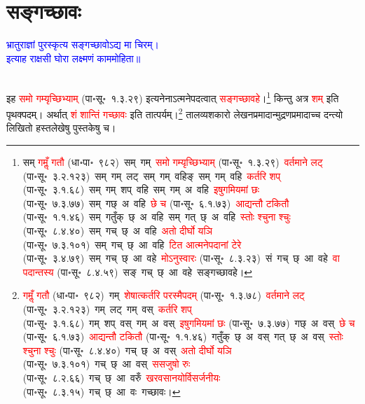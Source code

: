 \section[सङ्गच्छावः]{सङ्गच्छावः}
\centering\textcolor{blue}{भ्रातुराज्ञां पुरस्कृत्य सङ्गच्छावोऽद्य मा चिरम्।\nopagebreak\\
इत्याह राक्षसी घोरा लक्ष्मणं काममोहिता॥}\nopagebreak\\
\\
\fontsize{14}{21}\selectfont\begin{sloppypar}\justifying\noindent\hspace{10mm} इह \textcolor{red}{समो गम्यृच्छिभ्याम्} (पा॰सू॰~१.३.२९) इत्यनेनाऽत्मनेपदत्वात् \textcolor{red}{सङ्गच्छावहे}।\footnote{सम् \textcolor{red}{गमॢँ गतौ} (धा॰पा॰~९८२)~\arrow सम्~गम्~\arrow \textcolor{red}{समो गम्यृच्छिभ्याम्} (पा॰सू॰~१.३.२९)~\arrow \textcolor{red}{वर्तमाने लट्} (पा॰सू॰~३.२.१२३)~\arrow सम्~गम्~लट्~\arrow सम्~गम्~वहिङ्~\arrow सम्~गम्~वहि~\arrow \textcolor{red}{कर्तरि शप्‌} (पा॰सू॰~३.१.६८)~\arrow सम्~गम्~शप्~वहि~\arrow सम्~गम्~अ~वहि~\arrow \textcolor{red}{इषुगमियमां छः} (पा॰सू॰~७.३.७७)~\arrow सम्~गछ्~अ~वहि~\arrow \textcolor{red}{छे च} (पा॰सू॰~६.१.७३)~\arrow \textcolor{red}{आद्यन्तौ टकितौ} (पा॰सू॰~१.१.४६)~\arrow सम्~गतुँक्~छ्~अ~वहि~\arrow सम्~गत्~छ्~अ~वहि~\arrow \textcolor{red}{स्तोः श्चुना श्चुः} (पा॰सू॰~८.४.४०)~\arrow सम्~गच्~छ्~अ~वहि~\arrow \textcolor{red}{अतो दीर्घो यञि} (पा॰सू॰~७.३.१०१)~\arrow सम्~गच्~छ्~आ~वहि~\arrow \textcolor{red}{टित आत्मनेपदानां टेरे} (पा॰सू॰~३.४.७९)~\arrow सम्~गच्~छ्~आ~वहे~\arrow \textcolor{red}{मोऽनुस्वारः} (पा॰सू॰~८.३.२३)~\arrow सं~गच्~छ्~आ~वहे~\arrow \textcolor{red}{वा पदान्तस्य} (पा॰सू॰~८.४.५९)~\arrow सङ्~गच्~छ्~आ~वहे~\arrow सङ्गच्छावहे।} किन्तु अत्र \textcolor{red}{शम्} इति पृथक्पदम्। अर्थात् \textcolor{red}{शं शान्तिं गच्छावः} इति तात्पर्यम्।\footnote{\textcolor{red}{गमॢँ गतौ} (धा॰पा॰~९८२)~\arrow गम्~\arrow \textcolor{red}{शेषात्कर्तरि परस्मैपदम्} (पा॰सू॰~१.३.७८)~\arrow \textcolor{red}{वर्तमाने लट्} (पा॰सू॰~३.२.१२३)~\arrow गम्~लट्~\arrow गम्~वस्~\arrow \textcolor{red}{कर्तरि शप्‌} (पा॰सू॰~३.१.६८)~\arrow गम्~शप्~वस्~\arrow गम्~अ~वस्~\arrow \textcolor{red}{इषुगमियमां छः} (पा॰सू॰~७.३.७७)~\arrow गछ्~अ~वस्~\arrow \textcolor{red}{छे च} (पा॰सू॰~६.१.७३)~\arrow \textcolor{red}{आद्यन्तौ टकितौ} (पा॰सू॰~१.१.४६)~\arrow गतुँक्~छ्~अ~वस्~\arrow गत्~छ्~अ~वस्~\arrow \textcolor{red}{स्तोः श्चुना श्चुः} (पा॰सू॰~८.४.४०)~\arrow गच्~छ्~अ~वस्~\arrow \textcolor{red}{अतो दीर्घो यञि} (पा॰सू॰~७.३.१०१)~\arrow गच्~छ्~आ~वस्~\arrow \textcolor{red}{ससजुषो रुः} (पा॰सू॰~८.२.६६)~\arrow गच्~छ्~आ~वरुँ~\arrow \textcolor{red}{खरवसानयोर्विसर्जनीयः} (पा॰सू॰~८.३.१५)~\arrow गच्~छ्~आ~वः~\arrow गच्छावः।} तालव्य\-शकारो लेखनप्रमादान्मुद्रण\-प्रमादाच्च दन्त्यो लिखितो हस्तलेखेषु पुस्तकेषु च।\end{sloppypar}
